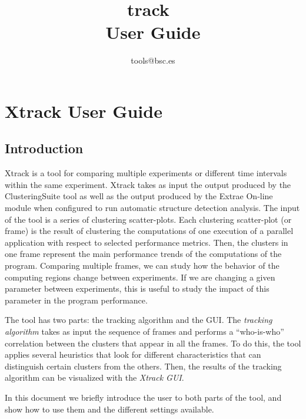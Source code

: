 \documentclass[twoside,a4,english,11pt]{book}
\newcommand{\XTRACK}{{\sf {X}track}\ }
\begin{document}

\title {
  \XTRACK \\
  User Guide
}

\author {
  tools@bsc.es
}

\maketitle
\tableofcontents

\chapter{Xtrack User Guide}

\section{Introduction}

Xtrack is a tool for comparing multiple experiments or different time intervals within the same experiment.
Xtrack takes as input the output produced by the ClusteringSuite tool \cite{BSCTools} as well as the 
output produced by the Extrae On-line module when configured to run automatic structure detection analysis. 
The input of the tool is a series of clustering scatter-plots. Each clustering scatter-plot (or frame) is the 
result of clustering the computations of one execution of a parallel application with respect to selected 
performance metrics. Then, the clusters in one frame represent the main performance trends of the computations 
of the program. Comparing multiple frames, we can study how the behavior of the computing regions change 
between experiments. If we are changing a given parameter between experiments, this is useful to study the 
impact of this parameter in the program performance.

The tool has two parts: the tracking algorithm and the GUI. The \emph{tracking algorithm} takes as 
input the sequence of frames and performs a ``who-is-who'' correlation between the clusters
that appear in all the frames. To do this, the tool applies several heuristics that 
look for different characteristics that can distinguish certain clusters from the others. Then, 
the results of the tracking algorithm can be visualized with the \emph{Xtrack GUI}. 

In this document we briefly introduce the user to both parts of the tool, and show how to use them and 
the different settings available.
\end{document}
